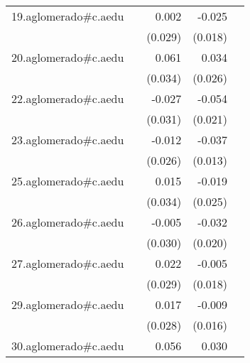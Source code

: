 {\begin{longtable}{l*{4}{D{.}{.}{-1}}}
\addlinespace
19.aglomerado#c.aedu&                     &       0.002         &      -0.025         &                     \\
            &                     &     (0.029)         &     (0.018)         &                     \\
\addlinespace
20.aglomerado#c.aedu&                     &       0.061         &       0.034         &                     \\
            &                     &     (0.034)         &     (0.026)         &                     \\
\addlinespace
22.aglomerado#c.aedu&                     &      -0.027         &      -0.054\sym{*}  &                     \\
            &                     &     (0.031)         &     (0.021)         &                     \\
\addlinespace
23.aglomerado#c.aedu&                     &      -0.012         &      -0.037\sym{**} &                     \\
            &                     &     (0.026)         &     (0.013)         &                     \\
\addlinespace
25.aglomerado#c.aedu&                     &       0.015         &      -0.019         &                     \\
            &                     &     (0.034)         &     (0.025)         &                     \\
\addlinespace
26.aglomerado#c.aedu&                     &      -0.005         &      -0.032         &                     \\
            &                     &     (0.030)         &     (0.020)         &                     \\
\addlinespace
27.aglomerado#c.aedu&                     &       0.022         &      -0.005         &                     \\
            &                     &     (0.029)         &     (0.018)         &                     \\
\addlinespace
29.aglomerado#c.aedu&                     &       0.017         &      -0.009         &                     \\
            &                     &     (0.028)         &     (0.016)         &                     \\
\addlinespace
30.aglomerado#c.aedu&                     &       0.056         &       0.030         &                     \\

\end{longtable}}
